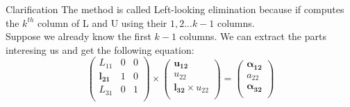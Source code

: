 \documentclass[9pt]{beamer}
\newcommand{\ccb}[1]{{\color{blue}#1}}
\newcommand{\ccp}[1]{{\color{purple}#1}}
\begin{document}
	\begin{frame}{Clarification}
		The method is called \ccp{Left-looking elimination} because if computes the \ccb{$k^{th}$} column of L and U using their $1,2...k-1$ columns.\\ \pause\bigskip
		Suppose we already know the first \ccb{$k-1$} columns. We can extract the parts interesing us and get the following equation:\bigskip
		\[
			\left( \begin{array}{ccc} L_{11} & 0  & 0\\ \pmb{l_{21}} & 1  & 0\\  L_{31} & 0  & 1\\ \end{array} \right) \times\left( \begin{array}{ccc} \pmb{u_{12}}   \\ u_{22}   \\  \pmb{l_{32}}\times u_{22} \\ \end{array} \right) = \left( \begin{array}{ccc}  \pmb{\alpha_{12}} \\ a_{22}\\ \pmb{\alpha_{32}}  \\ \end{array} \right)
		\]
	\end{frame}
\end{document}
